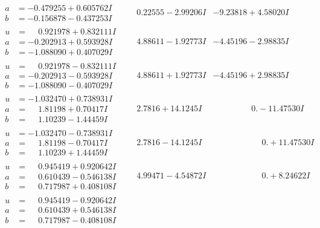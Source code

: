 \documentclass[1p]{elsarticle_modified}
\theoremstyle{definition}
\begin{document}
$$\begin{array}{c|c|c}
\begin{aligned}
a &= -0.479255 + 0.605762 I \\
b &= -0.156878 - 0.437253 I\end{aligned}
 & \phantom{-}0.22555 - 2.99206 I & -9.23818 + 4.58020 I \\ \hline\begin{aligned}
u &= \phantom{-}0.921978 + 0.832111 I \\
a &= -0.202913 + 0.593928 I \\
b &= -1.088090 + 0.407029 I\end{aligned}
 & \phantom{-}4.88611 - 1.92773 I & -4.45196 - 2.98835 I \\ \hline\begin{aligned}
u &= \phantom{-}0.921978 - 0.832111 I \\
a &= -0.202913 - 0.593928 I \\
b &= -1.088090 - 0.407029 I\end{aligned}
 & \phantom{-}4.88611 + 1.92773 I & -4.45196 + 2.98835 I \\ \hline\begin{aligned}
u &= -1.032470 + 0.738931 I \\
a &= \phantom{-}1.81198 + 0.70417 I \\
b &= \phantom{-}1.10239 - 1.44459 I\end{aligned}
 & \phantom{-}2.7816 + 14.1245 I & \phantom{-0.000000 } 0. - 11.47530 I \\ \hline\begin{aligned}
u &= -1.032470 - 0.738931 I \\
a &= \phantom{-}1.81198 - 0.70417 I \\
b &= \phantom{-}1.10239 + 1.44459 I\end{aligned}
 & \phantom{-}2.7816 - 14.1245 I & \phantom{-0.000000 -}0. + 11.47530 I \\ \hline\begin{aligned}
u &= \phantom{-}0.945419 + 0.920642 I \\
a &= \phantom{-}0.610439 - 0.546138 I \\
b &= \phantom{-}0.717987 + 0.408108 I\end{aligned}
 & \phantom{-}4.99471 - 4.54872 I & \phantom{-0.000000 -}0. + 8.24622 I \\ \hline\begin{aligned}
u &= \phantom{-}0.945419 - 0.920642 I \\
a &= \phantom{-}0.610439 + 0.546138 I \\
b &= \phantom{-}0.717987 - 0.408108 I\end{aligned}

\end{array}$$
\end{document}

